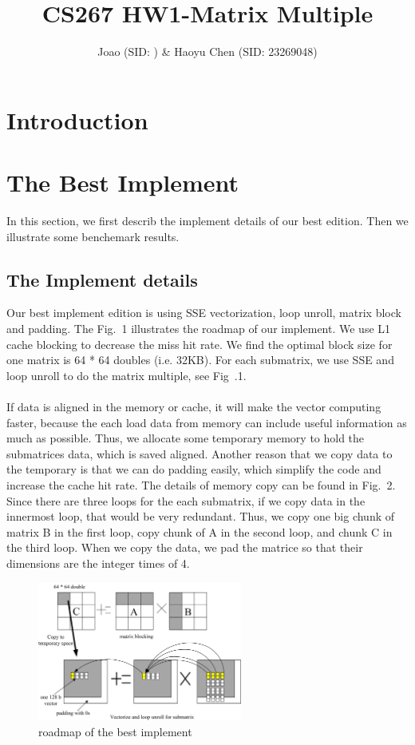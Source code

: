 \documentclass[10pt]{article}
\title{\textbf{CS267 HW1-Matrix Multiple}}
\author{Joao (SID: ) \& Haoyu Chen (SID: 23269048)}
\date{}
\begin{document}
\maketitle

\section{Introduction}
\section{The Best Implement}
In this section, we first describ the implement details of our best edition. Then we illustrate some benchemark results.
\subsection{The Implement details}
Our best implement edition is using SSE vectorization, loop unroll, matrix block and padding. The Fig.~1 illustrates the roadmap of our implement. We use L1 cache blocking to decrease the miss hit rate. We find the optimal block size for one matrix is 64 * 64 doubles (i.e. 32KB). For each submatrix, we use SSE and loop unroll to do the matrix multiple, see Fig~.1. \\
\\
If data is aligned in the memory or cache, it will make the vector computing faster, because the each load data from memory can include useful information as much as possible. Thus, we allocate some temporary memory to hold the submatrices data, which is saved aligned. Another reason that we copy data to the temporary is that we can do padding easily, which simplify the code and increase the cache hit rate. The details of memory copy can be found in Fig.~2. Since there are three loops for the each submatrix, if we copy data in the innermost loop, that would be very redundant. Thus, we copy one big chunk of matrix B in the first loop, copy chunk of A in the second loop, and chunk C in the third loop. When we copy the data, we pad the matrice so that their dimensions are the integer times of 4.\\   
\begin{figure}[h!]
  \centering
      \includegraphics[width=0.6\textwidth]{267_1_1.jpg}
  \caption{roadmap of the best implement}
\end{figure}
\end{document}
